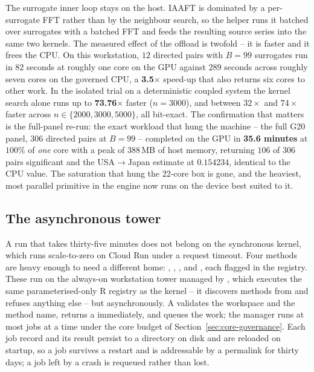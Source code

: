 The surrogate inner loop stays on the host. IAAFT is dominated by a per-surrogate FFT
rather than by the neighbour search, so the helper runs it batched over surrogates
with a batched FFT and feeds the resulting source series into the same two kernels.
The measured effect of the offload is twofold -- it is faster and it frees the CPU. On
this workstation, $12$ directed pairs with $B=99$ surrogates run in $82$ seconds at
roughly one core on the GPU against $289$ seconds across roughly seven cores on the
governed CPU, a \textbf{3.5$\times$} speed-up that also returns six cores to other
work. In the isolated trial on a deterministic coupled system the kernel search alone
runs up to \textbf{73.76$\times$} faster ($n=3000$), and between $32\times$ and
$74\times$ faster across $n \in \{2000, 3000, 5000\}$, all bit-exact. The
confirmation that matters is the full-panel re-run: the exact workload that hung the
machine -- the full G20 panel, $306$ directed pairs at $B=99$ -- completed on the GPU
in \textbf{35.6 minutes} at $100\%$ of \emph{one} core with a peak of $388$\,MB of
host memory, returning $106$ of $306$ pairs significant and the USA${\to}$Japan
estimate at $\mathbf{0.154234}$, identical to the CPU value. The saturation that hung
the 22-core box is gone, and the heaviest, most parallel primitive in the engine now
runs on the device best suited to it.

\subsection{The asynchronous tower}
\label{sec:async-tower}

A run that takes thirty-five minutes does not belong on the synchronous kernel, which
runs scale-to-zero on Cloud Run under a request timeout. Four methods are heavy enough
to need a different home: , ,
, and , each flagged
 in the registry. These run on the always-on workstation tower
managed by , which executes the same parameterised-only R
registry as the kernel -- it discovers methods from  and refuses anything
else -- but asynchronously. A  validates the workspace
and the method name, returns a  immediately, and queues the work; the
manager runs at most  jobs at a time under the core budget of
Section~\ref{sec:core-governance}. Each job record and its result persist to a
 directory on disk and are reloaded on startup, so a job survives a
restart and is addressable by a permalink for thirty days; a job left
 by a crash is requeued rather than lost.

